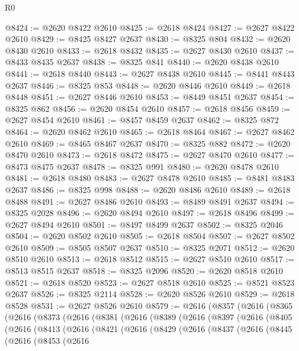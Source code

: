 \begin{lexlean}{R0}
\begin{coremodule}
@8424 := @2620 @8422 @2610
@8425 := @2618 @8424
@8427 := @2627 @8422 @2610
@8429 := @8425 @8427 @2637
@8430 := @8325 @804
@8432 := @2620 @8430 @2610
@8433 := @2618 @8432
@8435 := @2627 @8430 @2610
@8437 := @8433 @8435 @2637
@8438 := @8325 @841
@8440 := @2620 @8438 @2610
@8441 := @2618 @8440
@8443 := @2627 @8438 @2610
@8445 := @8441 @8443 @2637
@8446 := @8325 @853
@8448 := @2620 @8446 @2610
@8449 := @2618 @8448
@8451 := @2627 @8446 @2610
@8453 := @8449 @8451 @2637
@8454 := @8325 @862
@8456 := @2620 @8454 @2610
@8457 := @2618 @8456
@8459 := @2627 @8454 @2610
@8461 := @8457 @8459 @2637
@8462 := @8325 @872
@8464 := @2620 @8462 @2610
@8465 := @2618 @8464
@8467 := @2627 @8462 @2610
@8469 := @8465 @8467 @2637
@8470 := @8325 @882
@8472 := @2620 @8470 @2610
@8473 := @2618 @8472
@8475 := @2627 @8470 @2610
@8477 := @8473 @8475 @2637
@8478 := @8325 @991
@8480 := @2620 @8478 @2610
@8481 := @2618 @8480
@8483 := @2627 @8478 @2610
@8485 := @8481 @8483 @2637
@8486 := @8325 @998
@8488 := @2620 @8486 @2610
@8489 := @2618 @8488
@8491 := @2627 @8486 @2610
@8493 := @8489 @8491 @2637
@8494 := @8325 @2028
@8496 := @2620 @8494 @2610
@8497 := @2618 @8496
@8499 := @2627 @8494 @2610
@8501 := @8497 @8499 @2637
@8502 := @8325 @2046
@8504 := @2620 @8502 @2610
@8505 := @2618 @8504
@8507 := @2627 @8502 @2610
@8509 := @8505 @8507 @2637
@8510 := @8325 @2071
@8512 := @2620 @8510 @2610
@8513 := @2618 @8512
@8515 := @2627 @8510 @2610
@8517 := @8513 @8515 @2637
@8518 := @8325 @2096
@8520 := @2620 @8518 @2610
@8521 := @2618 @8520
@8523 := @2627 @8518 @2610
@8525 := @8521 @8523 @2637
@8526 := @8325 @2114
@8528 := @2620 @8526 @2610
@8529 := @2618 @8528
@8531 := @2627 @8526 @2610
@8579 := @2616
    (@8357
      (@2616
        (@8365
          (@2616
            (@8373
              (@2616
                (@8381
                  (@2616
                    (@8389
                      (@2616
                        (@8397
                          (@2616
                            (@8405
                              (@2616
                                (@8413
                                  (@2616
                                    (@8421
                                      (@2616
                                        (@8429
                                          (@2616
                                            (@8437
                                              (@2616
                                                (@8445
                                                  (@2616
                                                    (@8453
                                                      (@2616

\end{coremodule}
\end{lexlean}
